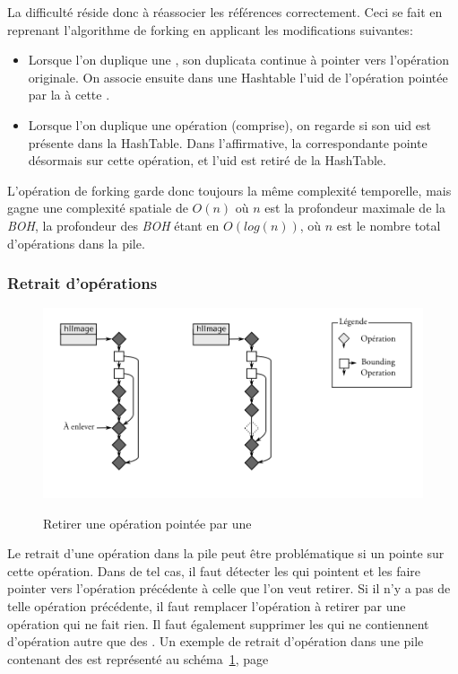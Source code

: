 			La difficulté réside donc à réassocier les références correctement. 
			Ceci se fait en reprenant l'algorithme de forking en applicant les modifications suivantes:
			\begin{itemize}
				\item Lorsque l'on duplique une \BO, son duplicata continue à pointer vers l'opération originale.
				On associe ensuite dans une Hashtable l'uid de l'opération pointée
				par la \BO à cette \BO. 
				\item Lorsque l'on duplique une opération (\BO comprise), on regarde si son uid est présente dans
				la HashTable. Dans l'affirmative, la \BO correspondante pointe désormais sur cette opération, et
				l'uid est retiré de la HashTable.
			\end{itemize}
			L'opération de forking garde donc toujours la même complexité temporelle, mais gagne une complexité spatiale
			de $O(n)$ où $n$ est la profondeur maximale de la \emph{BOH}, la profondeur des \emph{BOH} étant en $O(log(n))$, où $n$
			est le nombre total d'opérations dans la pile. 
			
			\subsubsection{Retrait d'opérations}
			\begin{figure}[ht]
				\centering
				\includegraphics[width=\textwidth]{images/bo-supress} 
				\label{fig:bo-supress}
				\caption{Retirer une opération pointée par une \BO}
			\end{figure}
			Le retrait d'une opération dans la pile peut être problématique si un \BO pointe sur cette opération. Dans de
			tel cas, il faut détecter les \BO qui pointent et les faire pointer vers l'opération précédente à celle
			que l'on veut retirer. Si il n'y a pas de telle opération précédente, il faut remplacer l'opération à retirer
			par une opération qui ne fait rien. Il faut également supprimer les \BO qui ne contiennent d'opération autre
			que des \BO.  Un exemple de retrait d'opération dans une pile contenant des \BO est représenté au 
			schéma~\ref{fig:bo-supress}, page~\pageref{fig:bo-supress}
			
